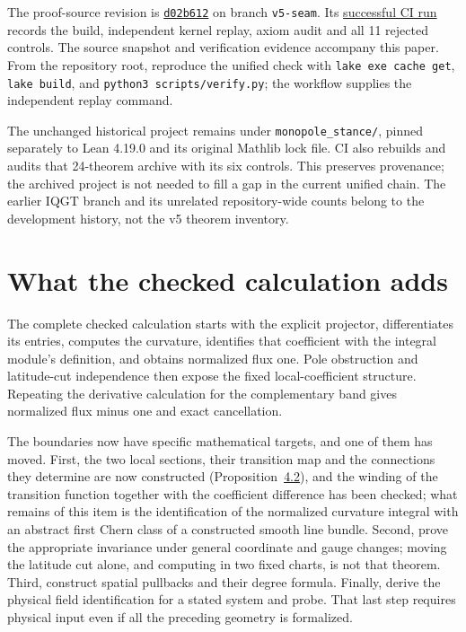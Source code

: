 \documentclass[11pt]{article}
\theoremstyle{definition}\newtheorem{definition}[theorem]{Definition}
\theoremstyle{remark}\newtheorem{remark}[theorem]{Remark}
\begin{document}
The proof-source revision is \href{https://github.com/dicipler-pixel/geometric-flux-magnetic-charge-lean/commit/d02b612e508e083e94baaf7d781ef15b76953f68}{\texttt{d02b612}} on branch \texttt{v5-seam}. Its \href{https://github.com/dicipler-pixel/geometric-flux-magnetic-charge-lean/actions/runs/42027723304}{successful CI run} records the build, independent kernel replay, axiom audit and all 11 rejected controls. The source snapshot and verification evidence accompany this paper. From the repository root, reproduce the unified check with \texttt{lake exe cache get}, \texttt{lake build}, and \texttt{python3 scripts/verify.py}; the workflow supplies the independent replay command.

The unchanged historical project remains under \texttt{monopole\_stance/}, pinned separately to Lean 4.19.0 and its original Mathlib lock file. CI also rebuilds and audits that 24-theorem archive with its six controls. This preserves provenance; the archived project is not needed to fill a gap in the current unified chain. The earlier IQGT branch and its unrelated repository-wide counts belong to the development history, not the v5 theorem inventory.

\section{What the checked calculation adds}
The complete checked calculation starts with the explicit projector, differentiates its entries, computes the curvature, identifies that coefficient with the integral module's definition, and obtains normalized flux one. Pole obstruction and latitude-cut independence then expose the fixed local-coefficient structure. Repeating the derivative calculation for the complementary band gives normalized flux minus one and exact cancellation.

The boundaries now have specific mathematical targets, and one of them has moved. First, the two local sections, their transition map and the connections they determine are now constructed (Proposition~\hyperref[prop:bundle]{4.2}), and the winding of the transition function together with the coefficient difference has been checked; what remains of this item is the identification of the normalized curvature integral with an abstract first Chern class of a constructed smooth line bundle. Second, prove the appropriate invariance under general coordinate and gauge changes; moving the latitude cut alone, and computing in two fixed charts, is not that theorem. Third, construct spatial pullbacks and their degree formula. Finally, derive the physical field identification for a stated system and probe. That last step requires physical input even if all the preceding geometry is formalized.
\end{document}
